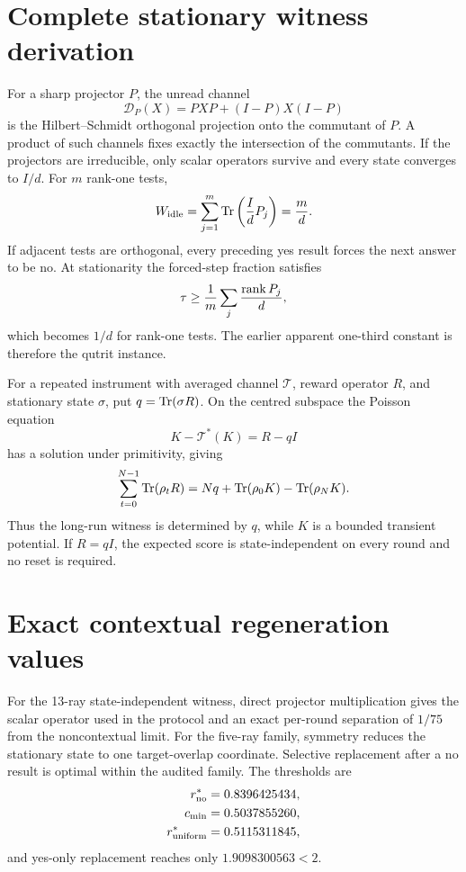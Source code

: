 \documentclass[11pt,a4paper]{article}
\begin{document}
\section{Complete stationary witness derivation}
For a sharp projector $P$, the unread channel
\begin{equation}
\mathcal D_P(X)=PXP+(I-P)X(I-P)
\end{equation}
is the Hilbert--Schmidt orthogonal projection onto the commutant of $P$. A product of such channels fixes exactly the intersection of the commutants. If the projectors are irreducible, only scalar operators survive and every state converges to $I/d$. For $m$ rank-one tests,
\begin{equation}
W_{\rm idle}=\sum_{j=1}^m\operatorname{Tr}\left(\frac{I}{d}P_j\right)=\frac md.
\end{equation}
If adjacent tests are orthogonal, every preceding yes result forces the next answer to be no. At stationarity the forced-step fraction satisfies
\begin{equation}
\tau\ge\frac1m\sum_j\frac{\operatorname{rank} P_j}{d},
\end{equation}
which becomes $1/d$ for rank-one tests. The earlier apparent one-third constant is therefore the qutrit instance.

For a repeated instrument with averaged channel $\mathcal T$, reward operator $R$, and stationary state $\sigma$, put $q=\operatorname{Tr}(\sigma R)$. On the centred subspace the Poisson equation
\begin{equation}
K-\mathcal T^*(K)=R-qI
\end{equation}
has a solution under primitivity, giving
\begin{equation}
\sum_{t=0}^{N-1}\operatorname{Tr}(\rho_tR)
=Nq+\operatorname{Tr}(\rho_0K)-\operatorname{Tr}(\rho_NK).
\end{equation}
Thus the long-run witness is determined by $q$, while $K$ is a bounded transient potential. If $R=qI$, the expected score is state-independent on every round and no reset is required.

\section{Exact contextual regeneration values}
For the 13-ray state-independent witness, direct projector multiplication gives the scalar operator used in the protocol and an exact per-round separation of $1/75$ from the noncontextual limit. For the five-ray family, symmetry reduces the stationary state to one target-overlap coordinate. Selective replacement after a no result is optimal within the audited family. The thresholds are
\begin{align}
r_{\rm no}^*&=0.8396425434,\\
c_{\min}&=0.5037855260,\\
r_{\rm uniform}^*&=0.5115311845,
\end{align}
and yes-only replacement reaches only $1.9098300563<2$.
\end{document}
